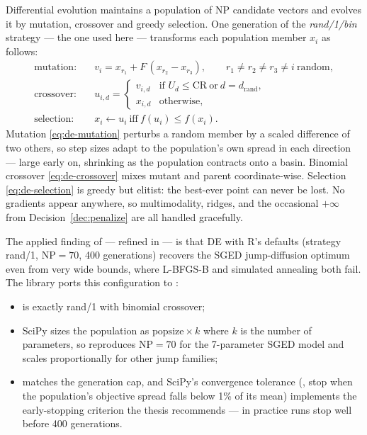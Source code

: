 Differential evolution \citep{StornPrice1997} maintains a population of
$\mathrm{NP}$ candidate vectors and evolves it by mutation, crossover and
greedy selection. One generation of the \emph{rand/1/bin} strategy --- the
one used here --- transforms each population member $x_i$ as follows:
\begin{align}
  \text{mutation:}\quad
    & v_i = x_{r_1} + F\,(x_{r_2} - x_{r_3}),
    \qquad r_1 \ne r_2 \ne r_3 \ne i \ \text{random},
    \label{eq:de-mutation}\\[2pt]
  \text{crossover:}\quad
    & u_{i,d} =
      \begin{cases}
        v_{i,d} & \text{if } U_d \le \mathrm{CR} \ \text{or}\ d = d_{\mathrm{rand}},\\
        x_{i,d} & \text{otherwise},
      \end{cases}
    \label{eq:de-crossover}\\[2pt]
  \text{selection:}\quad
    & x_i \leftarrow u_i \ \text{iff}\ f(u_i) \le f(x_i).
    \label{eq:de-selection}
\end{align}
Mutation \eqref{eq:de-mutation} perturbs a random member by a scaled
difference of two others, so step sizes adapt to the population's own
spread in each direction --- large early on, shrinking as the population
contracts onto a basin. Binomial crossover \eqref{eq:de-crossover} mixes
mutant and parent coordinate-wise. Selection \eqref{eq:de-selection} is
greedy but elitist: the best-ever point can never be lost. No gradients
appear anywhere, so multimodality, ridges, and the occasional
$+\infty$ from Decision~\ref{dec:penalize} are all handled gracefully.

\begin{decision}
\label{dec:de-config}
The applied finding of \citet{Ospina2009} --- refined in
\citet{Ardia2011} --- is that DE with R's  defaults
(strategy rand/1, $\mathrm{NP} = 70$, 400 generations) recovers the SGED
jump-diffusion optimum even from very wide bounds, where L-BFGS-B and
simulated annealing both fail. The library ports this configuration to
:
\begin{itemize}
  \item {} is exactly rand/1 with binomial
        crossover;
  \item SciPy sizes the population as $\mathrm{popsize} \times k$ where
        $k$ is the number of parameters, so  reproduces
        $\mathrm{NP} = 70$ for the 7-parameter SGED model and scales
        proportionally for other jump families;
  \item {} matches the generation cap, and SciPy's
        convergence tolerance (, stop when the population's
        objective spread falls below 1\% of its mean) implements the
        early-stopping criterion the thesis recommends --- in practice
        runs stop well before 400 generations.
\end{itemize}
\end{decision}

